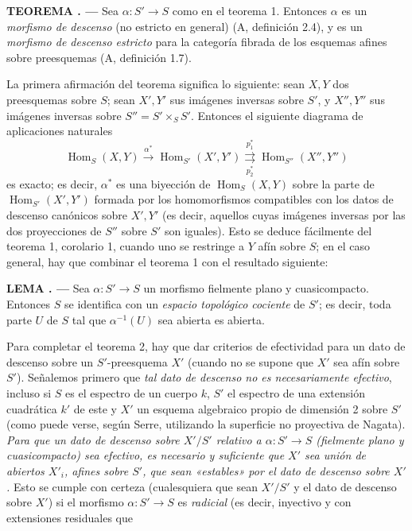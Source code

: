 \documentclass[11pt,twoside,openany]{book}
\numberwithin{equation}{section}
\theoremstyle{plain}
\theoremstyle{definition}
\theoremstyle{remark}
\newcommand{\result}[2]{%
  \par\medskip\noindent\textbf{#1%
  \if\relax\detokenize{#2}\relax\else\space#2\fi. ---}\enspace
}
\theoremstyle{plain}
\theoremstyle{definition}
\theoremstyle{remark}
\begin{document}
\result{TEOREMA}{2} Sea $\alpha:S'\longrightarrow S$ como en el teorema 1.
Entonces $\alpha$ es un \emph{morfismo de descenso} (no estricto en general)
(A, definición 2.4), y es un \emph{morfismo de descenso estricto} para la
categoría fibrada de los esquemas afines sobre preesquemas
(A, definición 1.7).

La primera afirmación del teorema significa lo siguiente: sean $X,Y$ dos
preesquemas sobre $S$; sean $X',Y'$ sus imágenes inversas sobre $S'$, y
$X'',Y''$ sus imágenes inversas sobre $S''=S'\times_SS'$. Entonces el siguiente
diagrama de aplicaciones naturales
\[
  \operatorname{Hom}_S(X,Y)\xrightarrow{\alpha^*}
  \operatorname{Hom}_{S'}(X',Y')
  \underset{p_2^*}{\overset{p_1^*}{\rightrightarrows}}
  \operatorname{Hom}_{S''}(X'',Y'')
\]
es exacto; es decir, $\alpha^*$ es una biyección de
$\operatorname{Hom}_S(X,Y)$ sobre la parte de
$\operatorname{Hom}_{S'}(X',Y')$ formada por los homomorfismos compatibles con
los datos de descenso canónicos sobre $X',Y'$ (es decir, aquellos cuyas
imágenes inversas por las dos proyecciones de $S''$ sobre $S'$ son iguales).
Esto se deduce fácilmente del teorema 1, corolario 1, cuando uno se restringe
a $Y$ afín sobre $S$; en el caso general, hay que combinar el teorema 1 con el
resultado siguiente:

\result{LEMA}{1.2} Sea $\alpha:S'\longrightarrow S$ un morfismo fielmente plano
y cuasicompacto. Entonces $S$ se identifica con un \emph{espacio topológico
cociente} de $S'$; es decir, toda parte $U$ de $S$ tal que
$\alpha^{-1}(U)$ sea abierta es abierta.

Para completar el teorema 2, hay que dar criterios de efectividad para un dato
de descenso sobre un $S'$-preesquema $X'$ (cuando no se supone que $X'$ sea
afín sobre $S'$). Señalemos primero que \emph{tal dato de descenso no es
necesariamente efectivo}, incluso si $S$ es el espectro de un cuerpo $k$, $S'$
el espectro de una extensión cuadrática $k'$ de este y $X'$ un esquema
algebraico propio de dimensión 2 sobre $S'$ (como puede verse, según Serre,
utilizando la superficie no proyectiva de Nagata). \emph{Para que un dato de
descenso sobre $X'/S'$ relativo a $\alpha:S'\longrightarrow S$ (fielmente
plano y cuasicompacto) sea efectivo, es necesario y suficiente que $X'$ sea
unión de abiertos $X'_i$, afines sobre $S'$, que sean «estables» por el dato de
descenso sobre $X'$.} Esto se cumple con certeza (cualesquiera que sean $X'/S'$
y el dato de descenso sobre $X'$) si el morfismo
$\alpha:S'\longrightarrow S$ es \emph{radicial} (es decir, inyectivo y con
extensiones residuales que
\end{document}
